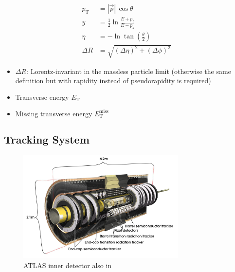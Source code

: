\begin{align*}
  p_\text{T} &= | \vec{p} | \, \cos\theta \\
  y &= \frac{1}{2} \ln\frac{E + p_z}{E - p_z} \\
  \eta &= -\ln\tan\left( \frac{\theta}{2} \right) \\
  \Delta R &= \sqrt{(\Delta\eta)^2 + (\Delta\phi)^2}
\end{align*}

\begin{itemize}
\item $\Delta R$: Lorentz-invariant in the massless particle limit (otherwise
  the same definition but with rapidity instead of pseudorapidity is required)
\item Transverse energy $E_\text{T}$
\item Missing transverse energy $E_\text{T}^\text{miss}$
\end{itemize}

\subsection{Tracking System}
\label{sec:atlas_tracking}

\begin{figure}[ht]
  \centering
  \includegraphics[width=0.75\textwidth]{./figures/atlas/inner_detector.jpg}
  \caption{ATLAS inner detector\cite{indet_fig} also in \cite{atlas_detector}}
  \label{fig:atlas_indet}
\end{figure}



